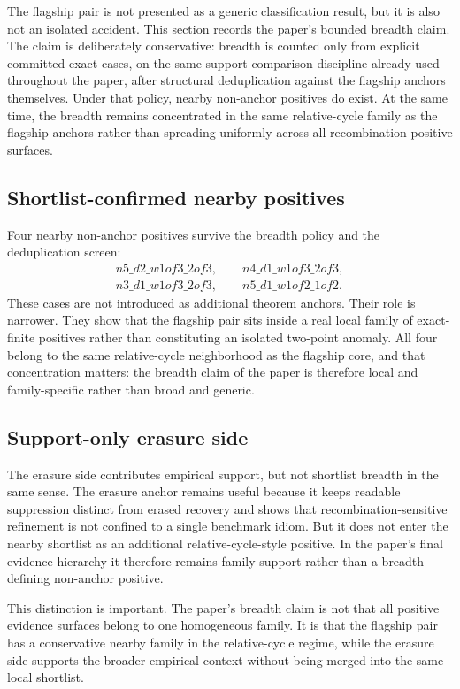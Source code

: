 \documentclass[11pt]{article}
\theoremstyle{definition}
\begin{document}
The flagship pair is not presented as a generic classification result, but it is also not an isolated accident. This section records the paper's bounded breadth claim. The claim is deliberately conservative: breadth is counted only from explicit committed exact cases, on the same-support comparison discipline already used throughout the paper, after structural deduplication against the flagship anchors themselves. Under that policy, nearby non-anchor positives do exist. At the same time, the breadth remains concentrated in the same relative-cycle family as the flagship anchors rather than spreading uniformly across all recombination-positive surfaces.

\subsection{Shortlist-confirmed nearby positives}

Four nearby non-anchor positives survive the breadth policy and the deduplication screen:
\begin{gather*}
n5\_d2\_w1of3\_2of3,\qquad
n4\_d1\_w1of3\_2of3,\\
n3\_d1\_w1of3\_2of3,\qquad
n5\_d1\_w1of2\_1of2.
\end{gather*}
These cases are not introduced as additional theorem anchors. Their role is narrower. They show that the flagship pair sits inside a real local family of exact-finite positives rather than constituting an isolated two-point anomaly. All four belong to the same relative-cycle neighborhood as the flagship core, and that concentration matters: the breadth claim of the paper is therefore local and family-specific rather than broad and generic.

\subsection{Support-only erasure side}

The erasure side contributes empirical support, but not shortlist breadth in the same sense. The erasure anchor remains useful because it keeps readable suppression distinct from erased recovery and shows that recombination-sensitive refinement is not confined to a single benchmark idiom. But it does not enter the nearby shortlist as an additional relative-cycle-style positive. In the paper's final evidence hierarchy it therefore remains family support rather than a breadth-defining non-anchor positive.

This distinction is important. The paper's breadth claim is not that all positive evidence surfaces belong to one homogeneous family. It is that the flagship pair has a conservative nearby family in the relative-cycle regime, while the erasure side supports the broader empirical context without being merged into the same local shortlist.
\end{document}
